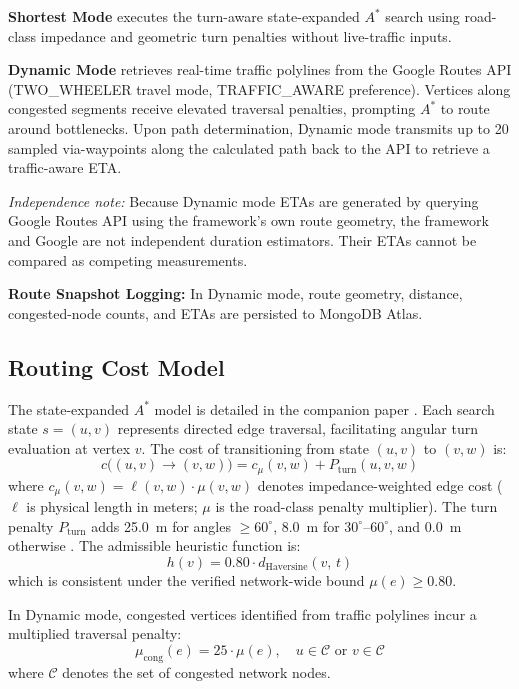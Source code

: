 \documentclass[11pt,conference]{IEEEtran}
\begin{document}
\noindent\textbf{Shortest Mode} executes the turn-aware state-expanded $A^*$ search \cite{anirudhr2026turnaware} using road-class impedance and geometric turn penalties without live-traffic inputs.

\noindent\textbf{Dynamic Mode} retrieves real-time traffic polylines from the Google Routes API (TWO\_WHEELER travel mode, TRAFFIC\_AWARE preference).
Vertices along congested segments receive elevated traversal penalties, prompting $A^*$ to route around bottlenecks.
Upon path determination, Dynamic mode transmits up to 20 sampled via-waypoints along the calculated path back to the API to retrieve a traffic-aware ETA.

\textit{Independence note:} Because Dynamic mode ETAs are generated by querying Google Routes API using the framework's own route geometry, the framework and Google are not independent duration estimators. Their ETAs cannot be compared as competing measurements.

\noindent\textbf{Route Snapshot Logging:} In Dynamic mode, route geometry, distance, congested-node counts, and ETAs are persisted to MongoDB Atlas.

\subsection{Routing Cost Model}

The state-expanded $A^*$ model is detailed in the companion paper \cite{anirudhr2026turnaware}.
Each search state $s = (u, v)$ represents directed edge traversal, facilitating angular turn evaluation at vertex $v$.
The cost of transitioning from state $(u,v)$ to $(v,w)$ is:
\begin{equation}
  c\bigl((u,v)\to(v,w)\bigr) = c_\mu(v,w) + P_\text{turn}(u,v,w)
  \label{eq:astar_cost}
\end{equation}
where $c_\mu(v,w) = \ell(v,w)\cdot\mu(v,w)$ denotes impedance-weighted edge cost ($\ell$ is physical length in meters; $\mu$ is the road-class penalty multiplier).
The turn penalty $P_\text{turn}$ adds 25.0~m for angles $\ge 60^\circ$, 8.0~m for $30^\circ$--$60^\circ$, and 0.0~m otherwise \cite{anirudhr2026turnaware}.
The admissible heuristic function is:
\begin{equation}
  h(v) = 0.80 \cdot d_\text{Haversine}(v,\, t)
  \label{eq:heuristic}
\end{equation}
which is consistent under the verified network-wide bound $\mu(e) \ge 0.80$.

In Dynamic mode, congested vertices identified from traffic polylines incur a multiplied traversal penalty:
\begin{equation}
  \mu_\text{cong}(e) = 25 \cdot \mu(e), \quad u \in \mathcal{C} \text{ or } v \in \mathcal{C}
  \label{eq:congestion}
\end{equation}
where $\mathcal{C}$ denotes the set of congested network nodes.
\end{document}
